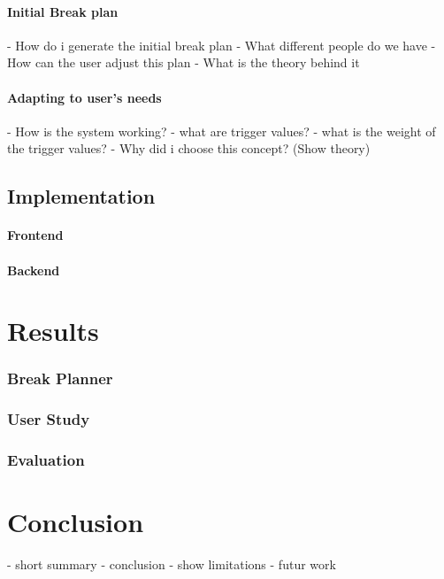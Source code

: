 \documentclass{hasel_thesis}
\begin{document}
\subsubsection{Initial Break plan}
- How do i generate the initial break plan
- What different people do we have
- How can the user adjust this plan
- What is the theory behind it
\subsubsection{Adapting to user's needs}
- How is the system working?
- what are trigger values?
- what is the weight of the trigger values?
- Why did i choose this concept? (Show theory)

\section{Implementation}
\subsubsection{Frontend}
\subsubsection{Backend}
\chapter{Results}
\subsection{Break Planner}
\subsection{User Study}
\subsection{Evaluation}
\chapter{Conclusion}
- short summary
- conclusion
    - show limitations
- futur work



% 
\end{document}
